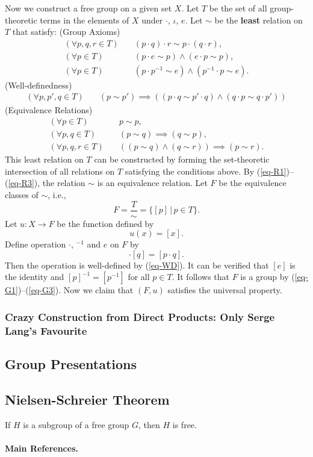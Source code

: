 Now we construct a free group on a given set $X$. Let $T$ be the set of all group-theoretic terms in the elements of $X$ under $\cdot$, $\iota$, $e$. Let $\sim$ be the \textbf{least} relation on $T$ that satisfy:
(Group Axioms)
\begin{align}
	(\forall p, q, r \in T) \quad &(p \cdot q) \cdot r \sim p \cdot (q \cdot r),  \label{eq-G1} \tag{G1}\\
	(\forall p \in T) \quad &(p \cdot e \sim p) \land (e \cdot p \sim p), \tag{G2}\\
	(\forall p \in T) \quad &(p \cdot p^{-1} \sim e) \land (p^{-1} \cdot p \sim e).  \label{eq-G3}\tag{G3}
\end{align}
(Well-definedness)
\begin{align}
	(\forall p, p', q \in T) \quad &(p \sim p') \implies ((p \cdot q \sim p' \cdot q) \land (q \cdot p \sim q \cdot p')) \label{eq-WD}\tag{WD}
\end{align}
(Equivalence Relations)
\begin{align}
	(\forall p \in T) \quad &p \sim p, \label{eq-R1} \tag{R1} \\
	(\forall p, q \in T) \quad &(p \sim q) \implies (q \sim p), \tag{R2}\\
	(\forall p, q, r \in T) \quad &((p \sim q) \land (q \sim r)) \implies (p \sim r).\label{eq-R3} \tag{R3}
\end{align}
This least relation on $T$ can be constructed by forming the set-theoretic intersection of all relations on $T$ satisfying the conditions above. By (\ref{eq-R1})--(\ref{eq-R3}), the relation $\sim$ is an equivalence relation. Let $F$ be the equivalence classes of $\sim$, i.e.,
\begin{equation*}
	F = \frac{T}{\sim} =\{[p]\,|\, p\in T\}.
\end{equation*}
Let $u:X\rightarrow F$ be the function defined by
\begin{equation*}
	u(x) = [x].
\end{equation*}
Define operation $\cdot$, ${}^{-1}$ and $e$ on $F$ by
\begin{equation*}
	[p]\cdot [q] = [p\cdot q].
\end{equation*}
Then the operation is well-defined by (\ref{eq-WD}). It can be verified that $[e]$ is the identity and $[p]^{-1} = [p^{-1}]$ for all $p\in T$. It follows that $F$ is a group by (\ref{eq-G1})--(\ref{eq-G3}). Now we claim that $(F,u)$ satisfies the universal property.



\subsubsection{Crazy Construction from Direct Products: Only Serge Lang's Favourite}
\subsection{Group Presentations}
\subsection{Nielsen-Schreier Theorem}
\begin{theorem}
	If $H$ is a subgroup of a free group $G$, then $H$ is free.
\end{theorem}

\paragraph{Main References.} \cite{Lang2002,Bergman2015,Ribes2010}